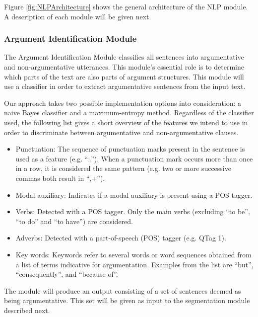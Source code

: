 Figure \ref{fig:NLPArchitecture} shows the general architecture of the NLP module. A description of each module will be given next.

\subsubsection{Argument Identification Module}
\par
The Argument Identification Module classifies all sentences into argumentative and non-argumentative utterances. This module's essential role is to determine which parts of the text are also parts of argument structures.
This module will use a classifier in order to extract argumentative sentences from the input text. 

\par
Our approach takes two possible implementation options into consideration: a naive Bayes classifier and a maximum-entropy method. Regardless of the classifier used, the following list gives a short overview of the features
we intend to use in order to discriminate between argumentative and non-argumentative clauses.

\begin{itemize}
\item Punctuation: The sequence of punctuation marks present in the sentence is used as a feature (e.g. ``:.''). When a punctuation mark occurs more than once in a row, it is considered the same pattern (e.g. two or more successive commas both result in ``,+'').
\item Modal auxiliary: Indicates if a modal auxiliary is present using a POS tagger.
\item Verbs: Detected with a POS tagger. Only the main verbs (excluding ``to be'', ``to do'' and ``to have'') are considered.
\item Adverbs: Detected with a part-of-speech (POS) tagger (e.g. QTag 1).
\item Key words:  Keywords refer to several words or word sequences obtained from a list of terms indicative for argumentation. Examples from the list are ``but'', ``consequently'', and ``because of''.
\end{itemize}

The module will produce an output consisting of a set of sentences deemed as being argumentative. This set will be given as input to the segmentation module described next.

